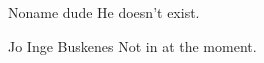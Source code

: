 \documentclass[12pt,journal,captionsoff,onecolumn]{IEEEtran}
\newcommand\1{\vec 1}
\begin{document}
\vfill 

\begin{IEEEbiography}{Noname dude}
He doesn't exist.
\end{IEEEbiography}

\begin{IEEEbiographynophoto}{Jo Inge Buskenes}
Not in at the moment.
\end{IEEEbiographynophoto}





\markboth{}%
{}
% 
\end{document}

